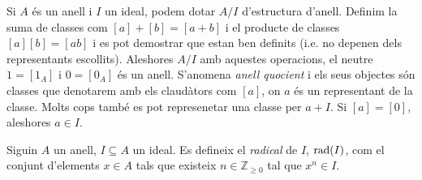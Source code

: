 \documentclass[../main.tex]{subfiles}
\begin{document}
\begin{defi}
\label{def:anellquocient} Si $A$ és un anell i $I$ un ideal, podem dotar $A/I$ d'estructura d'anell. Definim la suma de classes com $[a]+[b] = [a+b]$ i el producte de classes $[a][b] = [ab]$ i es pot demostrar que estan ben definits (i.e. no depenen dels representants escollits). Aleshores $A/I$ amb aquestes operacions, el neutre $1 = [1_A]$ i $0 = [0_A]$ és un anell. S'anomena \textit{anell quocient} i els seus objectes són classes que denotarem amb els claudàtors com $[a]$, on $a$ és un representant de la classe. Molts cops també es pot represenetar una classe per $a+I$. Si $[a] = [0]$, aleshores $a\in I$.
\end{defi}


\begin{defi}\label{def:radical}
Siguin $A$ un anell, $I\subseteq A$ un ideal. Es defineix el \textit{radical}\label{def:idealradical} de $I$, $\operatorname{\mathrm{rad}}(I)$, com el conjunt d'elements $x\in A$ tals que existeix $n\in \mathbb{Z}_{\geq 0}$ tal que $x^n\in I$.
\end{defi}
\end{document}
